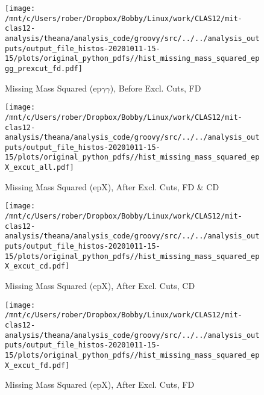 \documentclass{article}
\begin{document}
\begin{landscape}
    \begin{figure}[h]
        \centering

        \texttt{[image: /mnt/c/Users/rober/Dropbox/Bobby/Linux/work/CLAS12/mit-clas12-analysis/theana/analysis\_code/groovy/src/../../analysis\_outputs/output\_file\_histos-20201011-15-15/plots/original\_python\_pdfs//hist\_missing\_mass\_squared\_epgg\_prexcut\_fd.pdf]}
        \captionsetup{textformat=empty,labelformat=blank}
        \caption{Missing Mass Squared (ep$\gamma$$\gamma$), Before Excl. Cuts, FD}
    \end{figure}
    \clearpage
    
    \begin{figure}[h]
        \centering

        \texttt{[image: /mnt/c/Users/rober/Dropbox/Bobby/Linux/work/CLAS12/mit-clas12-analysis/theana/analysis\_code/groovy/src/../../analysis\_outputs/output\_file\_histos-20201011-15-15/plots/original\_python\_pdfs//hist\_missing\_mass\_squared\_epX\_excut\_all.pdf]}
        \captionsetup{textformat=empty,labelformat=blank}
        \caption{Missing Mass Squared (epX), After Excl. Cuts, FD \& CD}
    \end{figure}
    \clearpage
    
    \begin{figure}[h]
        \centering

        \texttt{[image: /mnt/c/Users/rober/Dropbox/Bobby/Linux/work/CLAS12/mit-clas12-analysis/theana/analysis\_code/groovy/src/../../analysis\_outputs/output\_file\_histos-20201011-15-15/plots/original\_python\_pdfs//hist\_missing\_mass\_squared\_epX\_excut\_cd.pdf]}
        \captionsetup{textformat=empty,labelformat=blank}
        \caption{Missing Mass Squared (epX), After Excl. Cuts, CD}
    \end{figure}
    \clearpage
    
    \begin{figure}[h]
        \centering

        \texttt{[image: /mnt/c/Users/rober/Dropbox/Bobby/Linux/work/CLAS12/mit-clas12-analysis/theana/analysis\_code/groovy/src/../../analysis\_outputs/output\_file\_histos-20201011-15-15/plots/original\_python\_pdfs//hist\_missing\_mass\_squared\_epX\_excut\_fd.pdf]}
        \captionsetup{textformat=empty,labelformat=blank}
        \caption{Missing Mass Squared (epX), After Excl. Cuts, FD}
    \end{figure}
    \clearpage
    
    \begin{figure}[h]
        \centering


\end{figure}
\end{landscape}
\end{document}
